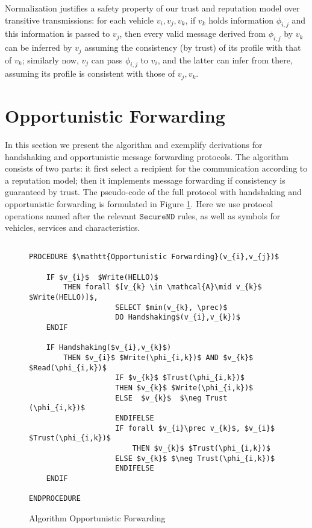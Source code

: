 \documentclass[compsoc, conference, letterpaper, 10pt, times]{IEEEtran}
\begin{document}
Normalization justifies a safety property of our trust and reputation model over transitive transmissions: for each vehicle $v_{i}, v_{j}, v_{k}$, if $v_{k}$ holds information $\phi_{i,j}$ and this information is passed to $v_{j}$, then every valid message derived from $\phi_{i,j}$ by $v_{k}$ can be inferred by $v_{j}$ assuming the consistency (by trust) of its profile with that of $v_{k}$; similarly now, $v_{j}$ can pass $\phi_{i,j}$ to $v_{i}$, and the latter can infer from there, assuming its profile is consistent with those of $v_{j}, v_{k}$.



\section{Opportunistic Forwarding}\label{sec:opportunistic}



In this section we present the algorithm and exemplify derivations for handshaking and opportunistic message forwarding protocols. The algorithm consists of two parts: it first select a recipient for the communication according to a reputation model; then it implements message forwarding if consistency is guaranteed by trust. The pseudo-code of the full protocol with handshaking and opportunistic forwarding is formulated in Figure \ref{fig:routine1}. Here we use protocol operations named after the relevant $\mathtt{SecureND}$ rules, as well as symbols for vehicles, services and characteristics.


\begin{figure}[t]
	\lstset{language=Java,
		basicstyle=\scriptsize,
		mathescape}
%	
	\begin{lstlisting}[frame=single]  % Start your code-block
	
PROCEDURE $\mathtt{Opportunistic Forwarding}(v_{i},v_{j})$
	
	IF $v_{i}$  $Write(HELLO)$ 
	    THEN forall $[v_{k} \in \mathcal{A}\mid v_{k}$ $Write(HELLO)]$, 
					SELECT $min(v_{k}, \prec)$
					DO Handshaking$(v_{i},v_{k})$
	ENDIF
			
	IF Handshaking($v_{i},v_{k}$)
		THEN $v_{i}$ $Write(\phi_{i,k})$ AND $v_{k}$ $Read(\phi_{i,k})$ 
					IF $v_{k}$ $Trust(\phi_{i,k})$
					THEN $v_{k}$ $Write(\phi_{i,k})$
					ELSE  $v_{k}$  $\neg Trust (\phi_{i,k})$
					ENDIFELSE
					IF forall $v_{i}\prec v_{k}$, $v_{i}$ $Trust(\phi_{i,k})$
						THEN $v_{k}$ $Trust(\phi_{i,k})$
					ELSE $v_{k}$ $\neg Trust(\phi_{i,k})$
					ENDIFELSE
	ENDIF
				
ENDPROCEDURE
	\end{lstlisting}
	\caption{Algorithm Opportunistic Forwarding}\label{fig:routine1}
\end{figure}
\end{document}
